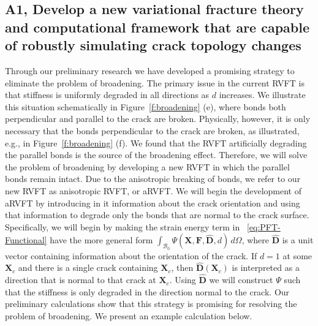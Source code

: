 \documentclass[10pt,letterpaper]{article}
\newcommand{\bs}[1]{\ensuremath{\boldsymbol{#1}}}
\begin{document}
  \subsection{A1, Develop a new variational fracture theory and computational framework that are capable of robustly simulating crack topology changes}
    \label{s:A1}

    Through our preliminary research we have developed a promising strategy to eliminate the problem of broadening.  The primary issue in the current RVFT is that stiffness is uniformly degraded in all directions as $d$ increases.   We illustrate this situation schematically in Figure~\ref{f:broadening} (e), where bonds both perpendicular and parallel to the crack are broken.   Physically, however,  it is only necessary that the bonds perpendicular to the crack are broken, as illustrated, e.g., in  Figure~\ref{f:broadening} (f).   We found that the RVFT artificially degrading the parallel bonds is the source of the broadening effect.   Therefore, we will solve the problem of broadening by developing a new RVFT in which the parallel bonds remain intact.   Due to the anisotropic breaking of bonds, we refer to our new RVFT as anisotropic RVFT, or aRVFT. We will begin the development of aRVFT by introducing in it information about the crack orientation and using that information to degrade only the bonds that are normal to the crack surface. Specifically, we will begin by making the strain energy term in ~\eqref{eq:PFT-Functional} have the more general form $\int_{\mathcal{B}_0}\mathsf{\Psi}(\bs{X}, \bs{F},\hat{\bs{D}},d)\, d\Omega$, where $\hat{\bs{D}}$ is a unit vector containing information about the orientation of the crack. If $d=1$ at some $\bs{X}_c$ and there is a single crack containing $\bs{X}_c$, then $\hat{\bs{D}}(\bs{X}_c)$ is interpreted as a direction that is normal to that crack at $\bs{X}_c$. Using $\hat{\bs{D}}$ we will construct $\mathsf{\Psi}$ such that the stiffness is only degraded in the direction normal to the crack. Our preliminary calculations show that this strategy is promising for resolving the problem of broadening. We present an example calculation below.%
\end{document}
